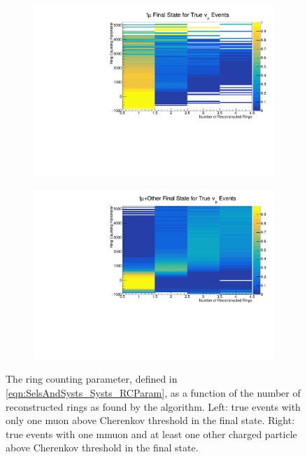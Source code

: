 \begin{figure}[h]
  \begin{subfigure}[t]{0.49\textwidth}
    \includegraphics[width=\textwidth, trim={0mm 0mm 0mm 0mm}, clip,page=1]{Figures/Selections/NuFlavour_14_Top_1.pdf}
  \end{subfigure}%
  \begin{subfigure}[t]{0.49\textwidth}
    \includegraphics[width=\textwidth, trim={0mm 0mm 0mm 0mm}, clip,page=1]{Figures/Selections/NuFlavour_14_Top_3.pdf}
  \end{subfigure}
  \caption{The ring counting parameter, defined in \autoref{eqn:SelsAndSysts_Systs_RCParam}, as a function of the number of reconstructed rings as found by the \fq algorithm. Left: true \quickmath{\nu_{\mu}} events with only one muon above Cherenkov threshold in the final state. Right: true \quickmath{\nu_{\mu}} events with one mmuon and at least one other charged particle above Cherenkov threshold in the final state.}
  \label{fig:SelsAndSysts_RCMaps}
\end{figure}


